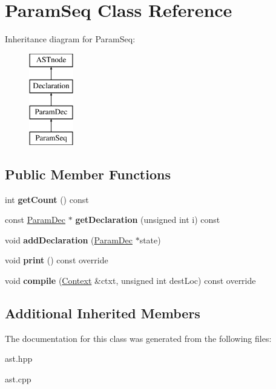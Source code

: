 \hypertarget{class_param_seq}{}\section{Param\+Seq Class Reference}
\label{class_param_seq}
Inheritance diagram for Param\+Seq\+:\begin{figure}[H]
\begin{center}
\leavevmode
\includegraphics[height=4.000000cm]{class_param_seq}
\end{center}
\end{figure}
\subsection*{Public Member Functions}
\begin{DoxyCompactItemize}
\item 
\mbox{\label{class_param_seq_a420d3b94a93ed350d3105d3a1f6ba6cb}} 
int {\bfseries get\+Count} () const
\item 
\mbox{\label{class_param_seq_ae3f4fae87e4d53ec8b6562ddfc7c348b}} 
const \hyperlink{class_param_dec}{Param\+Dec} $\ast$ {\bfseries get\+Declaration} (unsigned int i) const
\item 
\mbox{\label{class_param_seq_a873e0fbdd7b78c81c8ca1a6534025c68}} 
void {\bfseries add\+Declaration} (\hyperlink{class_param_dec}{Param\+Dec} $\ast$state)
\item 
\mbox{\label{class_param_seq_af48a90dce132044d38173108734cb2b4}} 
void {\bfseries print} () const override
\item 
\mbox{\label{class_param_seq_a696b80ee646bee48d67755cb2e20d77f}} 
void {\bfseries compile} (\hyperlink{class_context}{Context} \&ctxt, unsigned int dest\+Loc) const override
\end{DoxyCompactItemize}
\subsection*{Additional Inherited Members}


The documentation for this class was generated from the following files\+:\begin{DoxyCompactItemize}
\item 
ast.\+hpp\item 
ast.\+cpp\end{DoxyCompactItemize}
